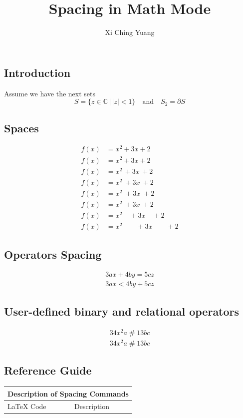 \documentclass{article}
\title{Spacing in Math Mode}
\author{Xi Ching Yuang}
\begin{document}
\maketitle

\subsection*{Introduction}
Assume we have the next sets
\[
S = \{ z \in \mathbb{C}\, |\, |z| < 1 \} \quad \textrm{and} \quad S_2=\partial{S}
\]

\subsection*{Spaces}

\begin{align*}
	f(x) &= x^2\! +3x\! +2 \\
	f(x) &= x^2+3x+2 \\
	f(x) &= x^2\, +3x\, +2 \\
	f(x) &= x^2\: +3x\: +2 \\
	f(x) &= x^2\; +3x\; +2 \\
	f(x) &= x^2\ +3x\ +2 \\
	f(x) &= x^2\quad +3x\quad +2 \\
	f(x) &= x^2\qquad +3x\qquad +2
\end{align*}

\subsection*{Operators Spacing}
\begin{align*}
	3ax+4by=5cz\\
	3ax<4by+5cz
\end{align*}

\subsection*{User-defined binary and relational operators}
\begin{align*}
	34x^2a \mathbin{\#} 13bc \\
	34x^2a \mathrel{\#} 13bc
	\end{align*}
	
	\subsection*{Reference Guide}
	\begin{tabular}{|l|l|}
		\hline 
		\multicolumn{2}{|c|}{Description of Spacing Commands} \\
		\hline
		
	LaTeX Code &Description \\	
	
		
	\end{tabular}
	
\end{document}
